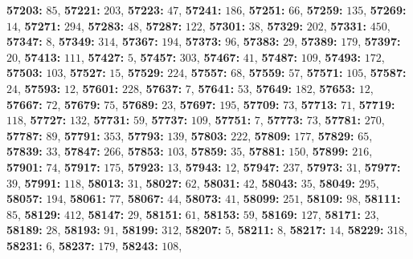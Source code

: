 \textsf{\bfseries 57203:} $85$, \textsf{\bfseries 57221:} $203$, \textsf{\bfseries 57223:} $47$, \textsf{\bfseries 57241:} $186$, \textsf{\bfseries 57251:} $66$, \textsf{\bfseries 57259:} $135$, \textsf{\bfseries 57269:} $14$, \textsf{\bfseries 57271:} $294$, \textsf{\bfseries 57283:} $48$, \textsf{\bfseries 57287:} $122$, \textsf{\bfseries 57301:} $38$, \textsf{\bfseries 57329:} $202$, \textsf{\bfseries 57331:} $450$, \textsf{\bfseries 57347:} $8$, \textsf{\bfseries 57349:} $314$, \textsf{\bfseries 57367:} $194$, \textsf{\bfseries 57373:} $96$, \textsf{\bfseries 57383:} $29$, \textsf{\bfseries 57389:} $179$, \textsf{\bfseries 57397:} $20$, \textsf{\bfseries 57413:} $111$, \textsf{\bfseries 57427:} $5$, \textsf{\bfseries 57457:} $303$, \textsf{\bfseries 57467:} $41$, \textsf{\bfseries 57487:} $109$, \textsf{\bfseries 57493:} $172$, \textsf{\bfseries 57503:} $103$, \textsf{\bfseries 57527:} $15$, \textsf{\bfseries 57529:} $224$, \textsf{\bfseries 57557:} $68$, \textsf{\bfseries 57559:} $57$, \textsf{\bfseries 57571:} $105$, \textsf{\bfseries 57587:} $24$, \textsf{\bfseries 57593:} $12$, \textsf{\bfseries 57601:} $228$, \textsf{\bfseries 57637:} $7$, \textsf{\bfseries 57641:} $53$, \textsf{\bfseries 57649:} $182$, \textsf{\bfseries 57653:} $12$, \textsf{\bfseries 57667:} $72$, \textsf{\bfseries 57679:} $75$, \textsf{\bfseries 57689:} $23$, \textsf{\bfseries 57697:} $195$, \textsf{\bfseries 57709:} $73$, \textsf{\bfseries 57713:} $71$, \textsf{\bfseries 57719:} $118$, \textsf{\bfseries 57727:} $132$, \textsf{\bfseries 57731:} $59$, \textsf{\bfseries 57737:} $109$, \textsf{\bfseries 57751:} $7$, \textsf{\bfseries 57773:} $73$, \textsf{\bfseries 57781:} $270$, \textsf{\bfseries 57787:} $89$, \textsf{\bfseries 57791:} $353$, \textsf{\bfseries 57793:} $139$, \textsf{\bfseries 57803:} $222$, \textsf{\bfseries 57809:} $177$, \textsf{\bfseries 57829:} $65$, \textsf{\bfseries 57839:} $33$, \textsf{\bfseries 57847:} $266$, \textsf{\bfseries 57853:} $103$, \textsf{\bfseries 57859:} $35$, \textsf{\bfseries 57881:} $150$, \textsf{\bfseries 57899:} $216$, \textsf{\bfseries 57901:} $74$, \textsf{\bfseries 57917:} $175$, \textsf{\bfseries 57923:} $13$, \textsf{\bfseries 57943:} $12$, \textsf{\bfseries 57947:} $237$, \textsf{\bfseries 57973:} $31$, \textsf{\bfseries 57977:} $39$, \textsf{\bfseries 57991:} $118$, \textsf{\bfseries 58013:} $31$, \textsf{\bfseries 58027:} $62$, \textsf{\bfseries 58031:} $42$, \textsf{\bfseries 58043:} $35$, \textsf{\bfseries 58049:} $295$, \textsf{\bfseries 58057:} $194$, \textsf{\bfseries 58061:} $77$, \textsf{\bfseries 58067:} $44$, \textsf{\bfseries 58073:} $41$, \textsf{\bfseries 58099:} $251$, \textsf{\bfseries 58109:} $98$, \textsf{\bfseries 58111:} $85$, \textsf{\bfseries 58129:} $412$, \textsf{\bfseries 58147:} $29$, \textsf{\bfseries 58151:} $61$, \textsf{\bfseries 58153:} $59$, \textsf{\bfseries 58169:} $127$, \textsf{\bfseries 58171:} $23$, \textsf{\bfseries 58189:} $28$, \textsf{\bfseries 58193:} $91$, \textsf{\bfseries 58199:} $312$, \textsf{\bfseries 58207:} $5$, \textsf{\bfseries 58211:} $8$, \textsf{\bfseries 58217:} $14$, \textsf{\bfseries 58229:} $318$, \textsf{\bfseries 58231:} $6$, \textsf{\bfseries 58237:} $179$, \textsf{\bfseries 58243:} $108$, 
